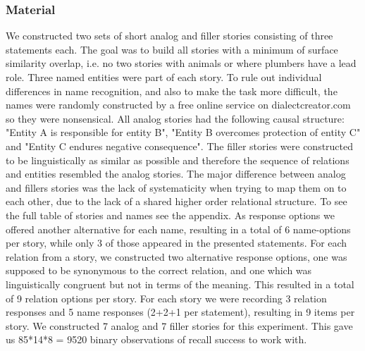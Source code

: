 \documentclass[a4paper,man,natbib,floatsintext,import]{apa6}
\begin{document}
\subsubsection{Material}
We constructed two sets of short analog and filler stories consisting of three statements each. The goal was to build all stories with a minimum of surface similarity overlap, i.e. no two stories with animals or where plumbers have a lead role. Three named entities were part of each story. To rule out individual differences in name recognition, and also to make the task more difficult, the names were randomly constructed by a free online service on dialectcreator.com so they were nonsensical. All analog stories had the following causal structure: "Entity A is responsible for entity B", "Entity B overcomes protection of entity C" and "Entity C endures negative consequence". The filler stories were constructed to be linguistically as similar as possible and therefore the sequence of relations and entities resembled the analog stories. The major difference between analog and fillers stories was the lack of systematicity when trying to map them on to each other, due to the lack of a shared higher order relational structure. To see the full table of stories and names see the appendix.
As response options we offered another alternative for each name, resulting in a total of 6 name-options per story, while only 3 of those appeared in the presented statements. For each relation from a story, we constructed two alternative response options, one was supposed to be synonymous to the correct relation, and one which was linguistically congruent but not in terms of the meaning. This resulted in a total of 9 relation options per story.
For each story we were recording 3 relation responses and 5 name responses (2+2+1 per statement), resulting in 9 items per story. We constructed 7 analog and 7 filler stories for this experiment. This gave us 85*14*8 = 9520 binary observations of recall success to work with.
\end{document}
